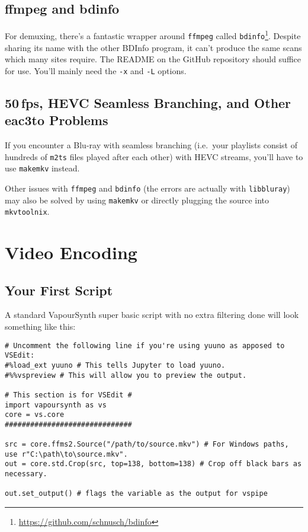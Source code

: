 \documentclass{scrartcl}
\begin{document}
\subsection{ffmpeg and bdinfo}

For demuxing, there's a fantastic wrapper around \texttt{ffmpeg} called \texttt{bdinfo}\footnote{\url{https://github.com/schnusch/bdinfo}}.  Despite sharing its name with the other BDInfo program, it can't produce the same scans which many sites require.  The README on the GitHub repository should suffice for use.  You'll mainly need the \texttt{-x} and \texttt{-L} options.

\subsection{50\,fps, HEVC Seamless Branching, and Other eac3to Problems}

If you encounter a Blu-ray with seamless branching (i.e.\ your playlists consist of hundreds of \texttt{m2ts} files played after each other) with HEVC streams, you'll have to use \texttt{makemkv} instead.

Other issues with \texttt{ffmpeg} and \texttt{bdinfo} (the errors are actually with \texttt{libbluray}) may also be solved by using \texttt{makemkv} or directly plugging the source into \texttt{mkvtoolnix}.

\section{Video Encoding}

\subsection{Your First Script}

A standard VapourSynth super basic script with no extra filtering done will look something like this:
\begin{lstlisting}
# Uncomment the following line if you're using yuuno as apposed to VSEdit:
#%load_ext yuuno # This tells Jupyter to load yuuno.
#%%vspreview # This will allow you to preview the output.

# This section is for VSEdit #
import vapoursynth as vs
core = vs.core
##############################

src = core.ffms2.Source("/path/to/source.mkv") # For Windows paths, use r"C:\path\to\source.mkv".
out = core.std.Crop(src, top=138, bottom=138) # Crop off black bars as necessary.

out.set_output() # flags the variable as the output for vspipe
\end{lstlisting}
\end{document}
